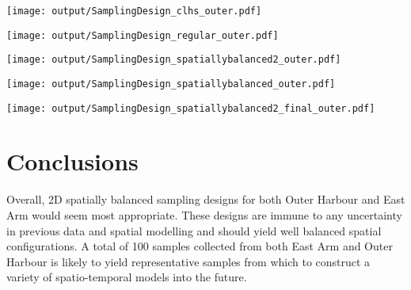 \documentclass[a4paper]{article}
\let\origfigure=\figure
\let\endorigfigure=\endfigure
\renewenvironment{figure}[1][]{%
   \origfigure[H]
}{%
   \endorigfigure
}
\begin{document}
\begin{figure}
\centering\scriptsize
\texttt{[image: output/SamplingDesign\_clhs\_outer.pdf]}
\caption{Sampling configurations associated with the lowest mean Error
for each sample size for cLHS for the Outer
Harbour\label{fig:SamplingDesign_clhs_outer}}
\end{figure}

\begin{figure}
\centering\scriptsize
\texttt{[image: output/SamplingDesign\_regular\_outer.pdf]}
\caption{Sampling configurations associated with the lowest mean Error
for each sample size for Regular grid sampling for the Outer
Harbour\label{fig:SamplingDesign_regular_outer}}
\end{figure}

\begin{figure}
\centering\scriptsize
\texttt{[image: output/SamplingDesign\_spatiallybalanced2\_outer.pdf]}
\caption{Sampling configurations associated with the lowest mean Error
for each sample size for nD Spatially balanced sampling for the Outer
Harbour\label{fig:SamplingDesign_spatiallybalanced2_outer}}
\end{figure}

\begin{figure}
\centering\scriptsize
\texttt{[image: output/SamplingDesign\_spatiallybalanced\_outer.pdf]}
\caption{Sampling configurations associated with the lowest mean Error
for each sample size for 2D Spatially balanced sampling for the Outer
Harbour\label{fig:SamplingDesign_spatiallybalanced_outer}}
\end{figure}

\begin{figure}
\centering\scriptsize
\texttt{[image: output/SamplingDesign\_spatiallybalanced2\_final\_outer.pdf]}
\caption{Two dimensional spatially balanced sampling configuration for
the Outer Harbour (100
samples)\label{fig:SamplingDesign_spatiallybalanced2_final_outer}}
\end{figure}

\hypertarget{conclusions}{%
\section{Conclusions}\label{conclusions}}

Overall, 2D spatially balanced sampling designs for both Outer Harbour
and East Arm would seem most appropriate. These designs are immune to
any uncertainty in previous data and spatial modelling and should yield
well balanced spatial configurations. A total of 100 samples collected
from both East Arm and Outer Harbour is likely to yield representative
samples from which to construct a variety of spatio-temporal models into
the future.
\end{document}
